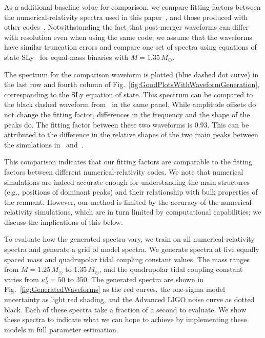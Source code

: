 \documentclass[../Thesis.tex]{subfiles}
\begin{document}
        As a additional baseline value for comparison, we compare fitting factors between the numerical-relativity spectra used in this paper~\cite{Rezzolla2016}, and those produced with other codes~\cite{Dietrich2018}. Notwithstanding the fact that post-merger waveforms can differ with resolution even when using the same code, we assume that the waveforms have similar truncation errors and compare one set of spectra using equations of state SLy~\cite[THC:0036:R03]{Radice2016} for equal-mass binaries with $M=1.35\,M_\odot$. 
        
        
        The spectrum  for the comparison waveform is plotted (blue dashed dot curve) in the last row and fourth column of Fig.~\ref{fig:GoodPlotsWithWaveformGeneration}, corresponding to the SLy equation of state. This spectrum can be compared to the black dashed waveform from~\cite{Rezzolla2016} in the same panel. While amplitude offsets do not change the fitting factor, differences in the frequency and the shape of the peaks do. The fitting factor between these two waveforms is 0.93. This can be attributed to the difference in the relative shapes of the two main peaks between the simulations in~\cite{Rezzolla2016} and~\cite{Radice2016}.\par
        This comparison indicates that our fitting factors are comparable to the fitting factors between different numerical-relativity codes. We note that numerical simulations are indeed accurate enough for understanding the main structures (e.g., positions of dominant peaks) and their relationship with bulk properties of the remnant. However, our method is limited by the accuracy of the numerical-relativity simulations, which are in turn limited by computational capabilities; we discuss the implications of this below.  \par
        To evaluate how the generated spectra vary, we train on all numerical-relativity spectra and generate a grid of model spectra. We generate spectra at five equally spaced mass and quadrupolar tidal coupling constant values. The mass ranges from $M=1.25\,M_\odot$ to 1.35\,$M_\odot$, and  the quadrupolar tidal coupling constant varies from $\kappa_2^\tau = 50$ to 350. The generated spectra are shown in Fig.~\ref{fig:GeneratedWaveforms} as the red curves,  the one-sigma model uncertainty as light red shading, and the Advanced LIGO noise curve as dotted black. Each of these spectra take a fraction of a second to evaluate. We show these spectra to indicate what we can hope to achieve by implementing these models in full parameter estimation. \par
\end{document}

